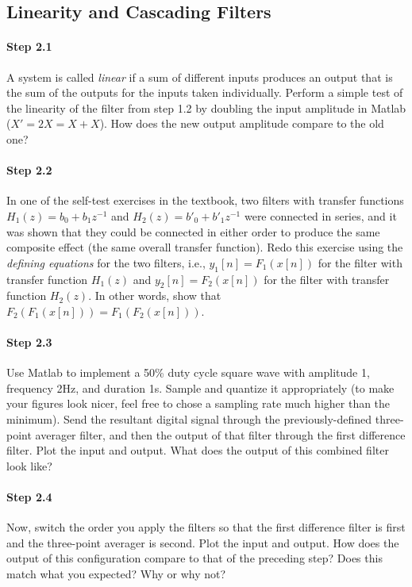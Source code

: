 \subsection{Linearity and Cascading Filters}

\paragraph{Step 2.1} A system is called \emph{linear} if a sum of
different inputs produces an output that is the sum of the outputs for
the inputs taken individually.  Perform a simple test of the linearity
of the filter from step 1.2 by doubling the input amplitude in Matlab
($X' = 2X = X + X$). How does the new output amplitude compare to the
old one?


\paragraph{Step 2.2} In one of the self-test exercises in the
textbook, two filters with transfer functions $H_1(z) = b_0 +
b_1z^{-1}$ and $H_2(z) = b'_0 + b'_1z^{-1}$ were connected in series,
and it was shown that they could be connected in either order to
produce the same composite effect (the same overall transfer
function). Redo this exercise using the \emph{defining equations} for
the two filters, i.e., $y_1[n] = F_1(x[n])$ for the filter with
transfer function $H_1(z)$ and $y_2[n] = F_2(x[n])$ for the filter
with transfer function $H_2(z)$. In other words, show that
$F_2(F_1(x[n])) = F_1(F_2(x[n]))$.


\paragraph{Step 2.3} Use Matlab to implement a 50\% duty cycle square
wave with amplitude 1, frequency 2Hz, and duration 1s. Sample and
quantize it appropriately (to make your figures look nicer, feel free
to chose a sampling rate much higher than the minimum). Send the
resultant digital signal through the previously-defined three-point
averager filter, and then the output of that filter through the first
difference filter. Plot the input and output. What does the output of
this combined filter look like?


\paragraph{Step 2.4} Now, switch the order you apply the filters so
that the first difference filter is first and the three-point averager
is second. Plot the input and output. How does the output of this
configuration compare to that of the preceding step? Does this match
what you expected? Why or why not?


